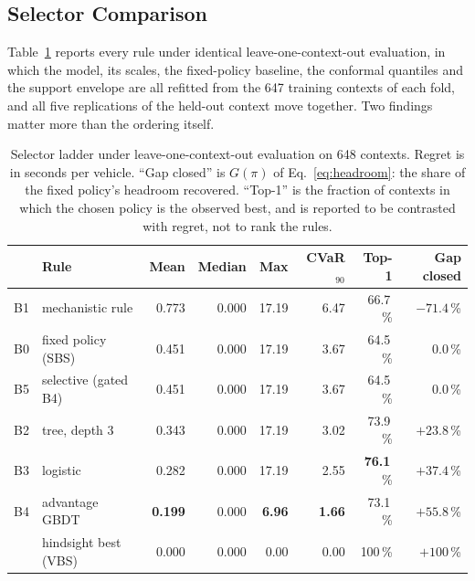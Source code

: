 
\subsection{Selector Comparison}
\label{sec:selection}

Table~\ref{tab:ladder} reports every rule under identical leave-one-context-out
evaluation, in which the model, its scales, the fixed-policy baseline, the
conformal quantiles and the support envelope are all refitted from the 647
training contexts of each fold, and all five replications of the held-out context
move together. Two findings matter more than the ordering itself.

\begin{table}[htbp]
\centering\footnotesize
\caption{Selector ladder under leave-one-context-out evaluation on 648 contexts.
Regret is in seconds per vehicle. ``Gap closed'' is $G(\pi)$ of
Eq.~\eqref{eq:headroom}: the share of the fixed policy's headroom recovered.
``Top-1'' is the fraction of contexts in which the chosen policy is the observed
best, and is reported to be contrasted with regret, not to rank the rules.}
\label{tab:ladder}
\setlength{\tabcolsep}{3.0pt}
\begin{tabular}{@{}llrrrrrr@{}}
\toprule
& Rule & Mean & Median & Max & CVaR$_{90}$ & Top-1 & Gap closed\\
\midrule
B1 & mechanistic rule & 0.773 & 0.000 & 17.19 & 6.47 & 66.7\,\% & $-71.4$\,\%\\
B0 & fixed policy (SBS) & 0.451 & 0.000 & 17.19 & 3.67 & 64.5\,\% & 0.0\,\%\\
B5 & selective (gated B4) & 0.451 & 0.000 & 17.19 & 3.67 & 64.5\,\% & 0.0\,\%\\
B2 & tree, depth 3 & 0.343 & 0.000 & 17.19 & 3.02 & 73.9\,\% & $+23.8$\,\%\\
B3 & logistic & 0.282 & 0.000 & 17.19 & 2.55 & \textbf{76.1}\,\% & $+37.4$\,\%\\
B4 & advantage GBDT & \textbf{0.199} & 0.000 & \textbf{6.96} & \textbf{1.66} & 73.1\,\% & $\mathbf{+55.8}$\,\%\\
\midrule
& hindsight best (VBS) & 0.000 & 0.000 & 0.00 & 0.00 & 100\,\% & $+100$\,\%\\
\bottomrule
\end{tabular}
\end{table}

